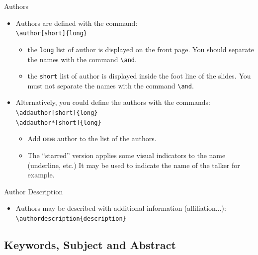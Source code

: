 \documentclass[english,sectioncirclenumberstyle]{ciadbeamer}
\begin{document}
\begin{frame}{Authors}
	\begin{itemize}
	\item Authors are defined with the command: \\
		\texttt{{\textbackslash}author[short]\{long\}}
		\begin{itemize}
		\item the \texttt{long} list of author is displayed on the front page. You should separate the names with the command \texttt{{\textbackslash}and}.
		\item the \texttt{short} list of author is displayed inside the foot line of the slides. You \alert{must not separate} the names with the command \texttt{{\textbackslash}and}.
		\end{itemize}
	\vfill
	\item \alert{Alternatively}, you could define the authors with the commands: \\
		\texttt{{\textbackslash}addauthor[short]\{long\}} \\
		\texttt{{\textbackslash}addauthor*[short]\{long\}}
		\begin{itemize}
		\item Add \textbf{one} author to the list of the authors.
		\item The ``starred'' version applies some visual indicators to the name (underline, etc.) It may be used to indicate the name of the talker for example.
		\end{itemize}
	\end{itemize}
	\vfill
\end{frame}

\begin{frame}{Author Description}
	\begin{itemize}
	\item Authors may be described with additional information (affiliation...): \\
		\texttt{{\textbackslash}authordescription\{description\}}
	\end{itemize}
	\vfill
\end{frame}

\subsection{Keywords, Subject and Abstract}
\end{document}
